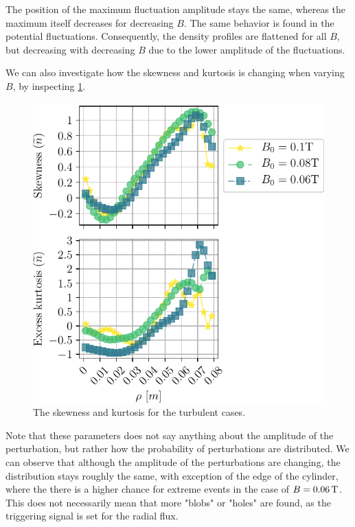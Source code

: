 The position of the maximum fluctuation amplitude stays the same, whereas the maximum itself decreases for decreasing $B$.
The same behavior is found in the potential fluctuations.
Consequently, the density profiles are flattened for all $B$, but decreasing with decreasing $B$ due to the lower amplitude of the fluctuations.

We can also investigate how the skewness and kurtosis is changing when varying $B$, by inspecting \cref{fig:BScanSkewKurt}.
%
\begin{figure}[htb]
    \centering
    \includegraphics{fig/results/bScan/BScanSkewKurt}
    \caption{The skewness and kurtosis for the turbulent cases.}
    \label{fig:BScanSkewKurt}
\end{figure}
%
Note that these parameters does not say anything about the amplitude of the perturbation, but rather how the probability of perturbations are distributed.
We can observe that although the amplitude of the perturbations are changing, the distribution stays roughly the same, with exception of the edge of the cylinder, where the there is a higher chance for extreme events in the case of $B=0.06\, \text{T}$.
This does not necessarily mean that more "blobs" or "holes" are found, as the triggering signal is set for the radial flux.

